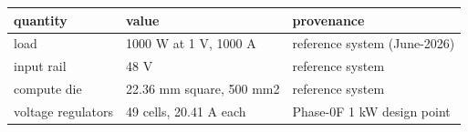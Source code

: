 \documentclass[10pt,]{article}
\begin{document}
\begin{longtable}[]{@{}lll@{}}
\toprule
\begin{minipage}[b]{0.30\columnwidth}\raggedright
quantity\strut
\end{minipage} & \begin{minipage}[b]{0.30\columnwidth}\raggedright
value\strut
\end{minipage} & \begin{minipage}[b]{0.30\columnwidth}\raggedright
provenance\strut
\end{minipage}\tabularnewline
\midrule
\endhead
\begin{minipage}[t]{0.30\columnwidth}\raggedright
load\strut
\end{minipage} & \begin{minipage}[t]{0.30\columnwidth}\raggedright
1000 W at 1 V, 1000 A\strut
\end{minipage} & \begin{minipage}[t]{0.30\columnwidth}\raggedright
reference system (June-2026)\strut
\end{minipage}\tabularnewline
\begin{minipage}[t]{0.30\columnwidth}\raggedright
input rail\strut
\end{minipage} & \begin{minipage}[t]{0.30\columnwidth}\raggedright
48 V\strut
\end{minipage} & \begin{minipage}[t]{0.30\columnwidth}\raggedright
reference system\strut
\end{minipage}\tabularnewline
\begin{minipage}[t]{0.30\columnwidth}\raggedright
compute die\strut
\end{minipage} & \begin{minipage}[t]{0.30\columnwidth}\raggedright
22.36 mm square, 500 mm2\strut
\end{minipage} & \begin{minipage}[t]{0.30\columnwidth}\raggedright
reference system\strut
\end{minipage}\tabularnewline
\begin{minipage}[t]{0.30\columnwidth}\raggedright
voltage regulators\strut
\end{minipage} & \begin{minipage}[t]{0.30\columnwidth}\raggedright
49 cells, 20.41 A each\strut
\end{minipage} & \begin{minipage}[t]{0.30\columnwidth}\raggedright
Phase-0F 1 kW design point\strut

\end{minipage}
\end{longtable}
\end{document}
